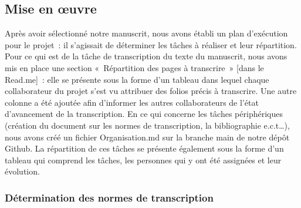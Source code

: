 \documentclass[12pt,a4paper,oneside,titlepage]{article} %
\begin{document}
	\subsection{Mise en œuvre}
	
	Après avoir sélectionné notre manuscrit, nous avons établi un plan d'exécution pour le projet : il s’agissait de déterminer les tâches à réaliser et leur répartition. Pour ce qui est de la tâche de transcription du texte du manuscrit, nous avons mis en place une section « Répartition des pages à transcrire » [dans le Read.me] : elle se présente sous la forme d’un tableau dans lequel chaque collaborateur du projet s’est vu attribuer des folios précis à transcrire. Une autre colonne a été ajoutée afin d’informer les autres collaborateurs de l’état d’avancement de la transcription. En ce qui concerne les tâches périphériques (création du document sur les normes de transcription, la bibliographie e.c.t…),  nous avons créé un fichier Organisation.md sur la branche main de notre dépôt Github. La répartition de ces tâches se présente également sous la forme d’un tableau qui comprend les tâches, les personnes qui y ont été assignées et leur évolution.
	

	\subsubsection{Détermination des normes de transcription}
	
\end{document}
